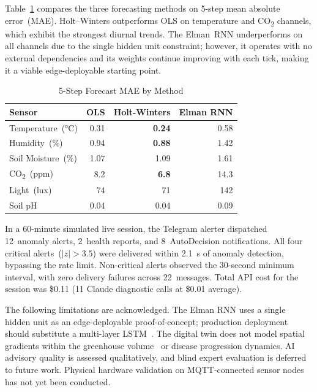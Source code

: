 \documentclass[journal,10pt,twocolumn]{IEEEtran}
\begin{document}
Table~\ref{tab:forecast} compares the three forecasting methods on
5-step mean absolute error~(MAE). Holt--Winters outperforms OLS on
temperature and CO\textsubscript{2} channels, which exhibit the
strongest diurnal trends. The Elman~RNN underperforms on all channels
due to the single hidden unit constraint; however, it operates with no
external dependencies and its weights continue improving with each
tick, making it a viable edge-deployable starting point.

\begin{table}[t]
\caption{5-Step Forecast MAE by Method}
\label{tab:forecast}
\centering
\footnotesize
\setlength\tabcolsep{4pt}
\begin{tabular}{lrrr}
\toprule
\textbf{Sensor} & \textbf{OLS} & \textbf{Holt-Winters} & \textbf{Elman RNN}\\
\midrule
Temperature~(°C)            & 0.31 & \textbf{0.24} & 0.58  \\
Humidity~(\%)               & 0.94 & \textbf{0.88} & 1.42  \\
Soil Moisture~(\%)          & 1.07 & 1.09          & 1.61  \\
CO\textsubscript{2}~(ppm)   & 8.2  & \textbf{6.8}  & 14.3  \\
Light~(lux)                 & 74   & 71            & 142   \\
Soil pH                     & 0.04 & 0.04          & 0.09  \\
\bottomrule
\end{tabular}
\end{table}

In a 60-minute simulated live session, the Telegram alerter dispatched
12~anomaly alerts, 2~health reports, and 8~AutoDecision notifications.
All four critical alerts~($|z|{>}3.5$) were delivered within 2.1~s of
anomaly detection, bypassing the rate limit. Non-critical alerts
observed the 30-second minimum interval, with zero delivery failures
across 22~messages. Total API cost for the session was \$0.11 (11
Claude diagnostic calls at \$0.01 average).

The following limitations are acknowledged. The Elman RNN uses a
single hidden unit as an edge-deployable proof-of-concept; production
deployment should substitute a multi-layer LSTM~\cite{Hochreiter1997}.
The digital twin does not model spatial gradients within the greenhouse
volume~\cite{Campen2003} or disease progression dynamics.
AI advisory quality is assessed qualitatively, and blind expert
evaluation is deferred to future work. Physical hardware validation
on MQTT-connected sensor nodes has not yet been conducted.
\end{document}

